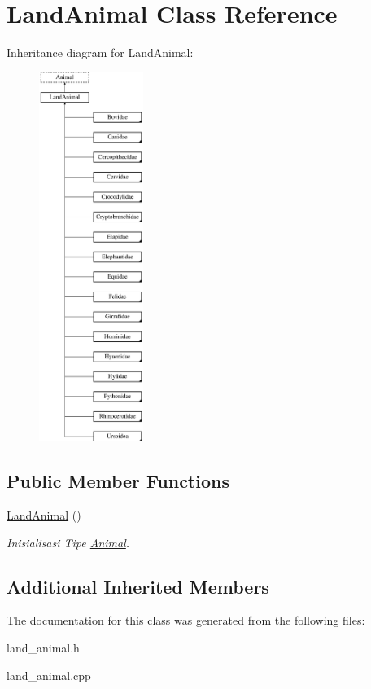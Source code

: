 \hypertarget{class_land_animal}{}\section{Land\+Animal Class Reference}
\label{class_land_animal}
Inheritance diagram for Land\+Animal\+:\begin{figure}[H]
\begin{center}
\leavevmode
\includegraphics[height=12.000000cm]{class_land_animal}
\end{center}
\end{figure}
\subsection*{Public Member Functions}
\begin{DoxyCompactItemize}
\item 
\hyperlink{class_land_animal_a95def5df7e0a8fe05ba953da1a7736c1}{Land\+Animal} ()\hypertarget{class_land_animal_a95def5df7e0a8fe05ba953da1a7736c1}{}\label{class_land_animal_a95def5df7e0a8fe05ba953da1a7736c1}

\begin{DoxyCompactList}\small\item\em Inisialisasi Tipe \hyperlink{class_animal}{Animal}. \end{DoxyCompactList}\end{DoxyCompactItemize}
\subsection*{Additional Inherited Members}


The documentation for this class was generated from the following files\+:\begin{DoxyCompactItemize}
\item 
land\+\_\+animal.\+h\item 
land\+\_\+animal.\+cpp\end{DoxyCompactItemize}

